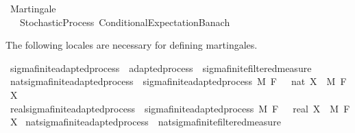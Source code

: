 %
\begin{isabellebody}%
%
%
\isadelimtheory
%
\endisadelimtheory
%
\isatagtheory
{}\isamarkupfalse%
\ Martingale\ \ \ \ \ \ \ \ \ \ \ \ \ \ \ \ \ \isanewline
\ \ \ Stochastic{\isacharunderscore}{\kern0pt}Process\ Conditional{\isacharunderscore}{\kern0pt}Expectation{\isacharunderscore}{\kern0pt}Banach\isanewline
{}%
\endisatagtheory
{\isafoldtheory}%
%
\isadelimtheory
%
\endisadelimtheory
%
\isadelimdocument
%
\endisadelimdocument
%
\isatagdocument
%
\isamarkuptrue%
%
\endisatagdocument
{\isafolddocument}%
%
\isadelimdocument
%
\endisadelimdocument
%
\begin{isamarkuptext}%
The following locales are necessary for defining martingales.%
\end{isamarkuptext}\isamarkuptrue%
\isamarkupfalse%
\ sigma{\isacharunderscore}{\kern0pt}finite{\isacharunderscore}{\kern0pt}adapted{\isacharunderscore}{\kern0pt}process\ {\isacharequal}{\kern0pt}\ adapted{\isacharunderscore}{\kern0pt}process\ {\isacharplus}{\kern0pt}\ sigma{\isacharunderscore}{\kern0pt}finite{\isacharunderscore}{\kern0pt}filtered{\isacharunderscore}{\kern0pt}measure\isanewline
\isanewline
{}\isamarkupfalse%
\ nat{\isacharunderscore}{\kern0pt}sigma{\isacharunderscore}{\kern0pt}finite{\isacharunderscore}{\kern0pt}adapted{\isacharunderscore}{\kern0pt}process\ {\isacharequal}{\kern0pt}\ sigma{\isacharunderscore}{\kern0pt}finite{\isacharunderscore}{\kern0pt}adapted{\isacharunderscore}{\kern0pt}process\ M\ F\ {\isachardoublequoteopen}{}\ {\isacharcolon}{\kern0pt}{\isacharcolon}{\kern0pt}\ nat{\isachardoublequoteclose}\ X\ \ M\ F\ X\isanewline
{}\isamarkupfalse%
\ real{\isacharunderscore}{\kern0pt}sigma{\isacharunderscore}{\kern0pt}finite{\isacharunderscore}{\kern0pt}adapted{\isacharunderscore}{\kern0pt}process\ {\isacharequal}{\kern0pt}\ sigma{\isacharunderscore}{\kern0pt}finite{\isacharunderscore}{\kern0pt}adapted{\isacharunderscore}{\kern0pt}process\ M\ F\ {\isachardoublequoteopen}{}\ {\isacharcolon}{\kern0pt}{\isacharcolon}{\kern0pt}\ real{\isachardoublequoteclose}\ X\ \ M\ F\ X\isanewline
\isanewline
{}\isamarkupfalse%
\ nat{\isacharunderscore}{\kern0pt}sigma{\isacharunderscore}{\kern0pt}finite{\isacharunderscore}{\kern0pt}adapted{\isacharunderscore}{\kern0pt}process\ {\isasymsubseteq}\ nat{\isacharunderscore}{\kern0pt}sigma{\isacharunderscore}{\kern0pt}finite{\isacharunderscore}{\kern0pt}filtered{\isacharunderscore}{\kern0pt}measure%

\end{isabellebody}
